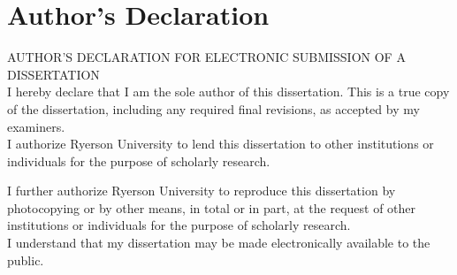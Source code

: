 

\chapter*{Author's Declaration} \label{authors-declaration}

AUTHOR'S DECLARATION FOR ELECTRONIC SUBMISSION OF A DISSERTATION \\
I hereby declare that I am the sole author of this dissertation. This is a true copy of the dissertation, including any required final revisions, as accepted by my examiners. \\

I authorize Ryerson University to lend this dissertation to other institutions or individuals for the purpose of scholarly research.

I further authorize Ryerson University to reproduce this dissertation by photocopying or by other means, in total or in part, at the request of other institutions or individuals for the purpose of scholarly research. \\

I understand that my dissertation may be made electronically available to the public.
